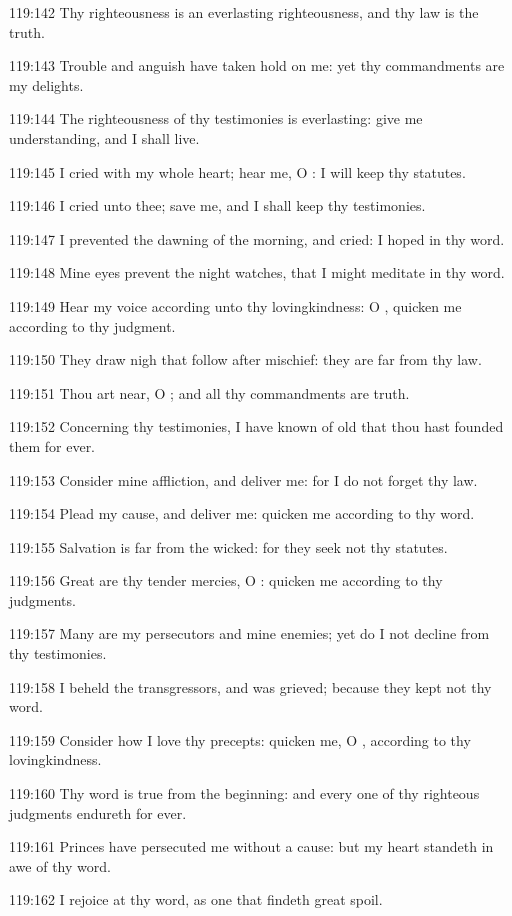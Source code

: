 119:142 Thy righteousness is an everlasting righteousness, and thy law
is the truth.

119:143 Trouble and anguish have taken hold on me: yet thy
commandments are my delights.

119:144 The righteousness of thy testimonies is everlasting: give me
understanding, and I shall live.

119:145 I cried with my whole heart; hear me, O \LORD: I will keep thy
statutes.

119:146 I cried unto thee; save me, and I shall keep thy testimonies.

119:147 I prevented the dawning of the morning, and cried: I hoped in
thy word.

119:148 Mine eyes prevent the night watches, that I might meditate in
thy word.

119:149 Hear my voice according unto thy lovingkindness: O \LORD,
quicken me according to thy judgment.

119:150 They draw nigh that follow after mischief: they are far from
thy law.

119:151 Thou art near, O \LORD; and all thy commandments are truth.

119:152 Concerning thy testimonies, I have known of old that thou hast
founded them for ever.

119:153 Consider mine affliction, and deliver me: for I do not forget
thy law.

119:154 Plead my cause, and deliver me: quicken me according to thy
word.

119:155 Salvation is far from the wicked: for they seek not thy
statutes.

119:156 Great are thy tender mercies, O \LORD: quicken me according to
thy judgments.

119:157 Many are my persecutors and mine enemies; yet do I not decline
from thy testimonies.

119:158 I beheld the transgressors, and was grieved; because they kept
not thy word.

119:159 Consider how I love thy precepts: quicken me, O \LORD,
according to thy lovingkindness.

119:160 Thy word is true from the beginning: and every one of thy
righteous judgments endureth for ever.

119:161 Princes have persecuted me without a cause: but my heart
standeth in awe of thy word.

119:162 I rejoice at thy word, as one that findeth great spoil.


